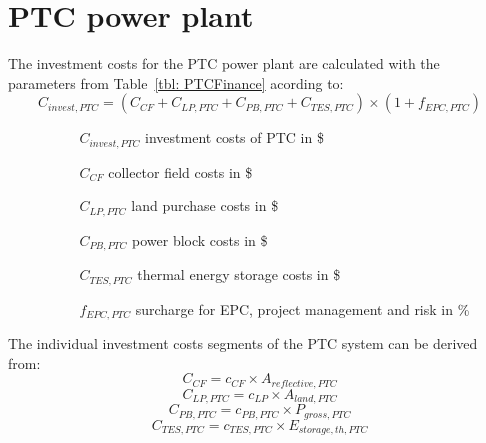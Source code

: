 \section{PTC power plant}
The investment costs for the PTC power plant are calculated with the parameters from Table~\ref{tbl: PTCFinance} acording to:
\begin{equation}
C_{invest,PTC} = (C_{CF}+C_{LP,PTC}+C_{PB,PTC}+C_{TES,PTC})\times(1+f_{EPC,PTC}) \label{GL_CRInvest}
\end{equation} 
\begin{itemize}
\item[ ] 
\begin{itemize}
\item[ ] 
\begin{itemize}
\item[$C_{invest,PTC}$]investment costs of PTC in \$
\item[$C_{CF}$]collector field costs in \$
\item[$C_{LP,PTC}$]land purchase costs in \$
\item[$C_{PB,PTC}$]power block costs in \$
\item[$C_{TES,PTC}$]thermal energy storage costs in \$
\item[$f_{EPC,PTC}$]surcharge for EPC, project management and risk in \%
\end{itemize}
\end{itemize}
\end{itemize}
The individual investment costs segments of the PTC system can be derived from:
\begin{equation}
C_{CF} = c_{CF} \times A_{reflective,PTC}
\end{equation} 
\begin{equation}
C_{LP,PTC} = c_{LP} \times A_{land,PTC}
\end{equation} 
\begin{equation}
C_{PB,PTC} = c_{PB,PTC} \times P_{gross,PTC}
\end{equation} 
\begin{equation}
C_{TES,PTC} = c_{TES,PTC} \times E_{storage,th,PTC}
\end{equation} 

